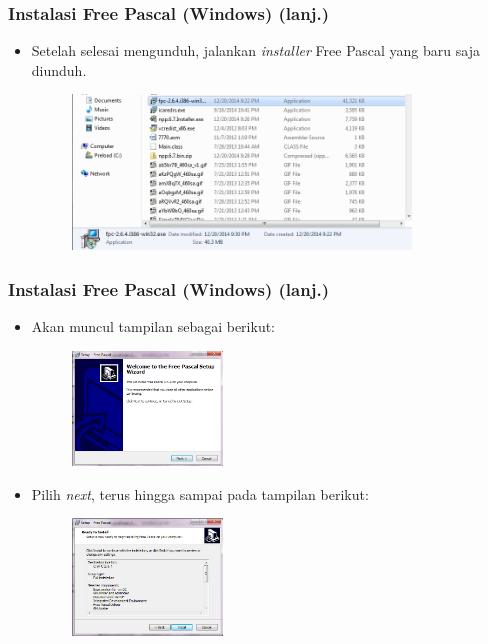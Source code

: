 \documentclass{beamer}
\begin{document}
\begin{frame}
\frametitle{Instalasi Free Pascal (Windows) (lanj.)}
\begin{itemize}
	\item Setelah selesai mengunduh, jalankan \textit{installer} Free Pascal yang baru saja diunduh.
	\begin{figure}
		\includegraphics[width=9cm]{asset/fpc_1.PNG}
	\end{figure}
\end{itemize}
\end{frame}

\begin{frame}
\frametitle{Instalasi Free Pascal (Windows) (lanj.)}
\begin{itemize}
	\item Akan muncul tampilan sebagai berikut:
	\begin{figure}
		\includegraphics[width=4cm]{asset/fpc_2.PNG}
	\end{figure}
	\item Pilih \textit{next}, terus hingga sampai pada tampilan berikut:
	\begin{figure}
		\includegraphics[width=4cm]{asset/fpc_7.PNG}
	\end{figure}
\end{itemize}
\end{frame}
\end{document}
